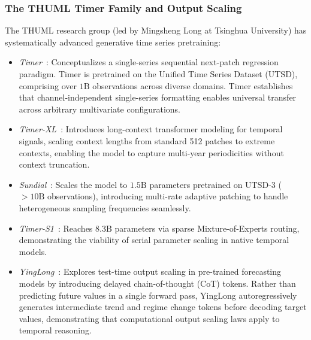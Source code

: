 \subsubsection{The THUML Timer Family and Output Scaling}
The THUML research group (led by Mingsheng Long at Tsinghua University) has systematically advanced generative time series pretraining:
\begin{itemize}[leftmargin=*]
    \item \emph{Timer}~\cite{liu2024timer}: Conceptualizes a single-series sequential next-patch regression paradigm. Timer is pretrained on the Unified Time Series Dataset (UTSD), comprising over $1\text{B}$ observations across diverse domains. Timer establishes that channel-independent single-series formatting enables universal transfer across arbitrary multivariate configurations.
    \item \emph{Timer-XL}~\cite{liu2024timerxl}: Introduces long-context transformer modeling for temporal signals, scaling context lengths from standard 512 patches to extreme contexts, enabling the model to capture multi-year periodicities without context truncation.
    \item \emph{Sundial}~\cite{thuml2025sundial}: Scales the model to $1.5\text{B}$ parameters pretrained on UTSD-3 ($>10\text{B}$ observations), introducing multi-rate adaptive patching to handle heterogeneous sampling frequencies seamlessly.
    \item \emph{Timer-S1}~\cite{thuml2026timers1}: Reaches $8.3\text{B}$ parameters via sparse Mixture-of-Experts routing, demonstrating the viability of serial parameter scaling in native temporal models.
    \item \emph{YingLong}~\cite{liu2025yinglong}: Explores test-time output scaling in pre-trained forecasting models by introducing delayed chain-of-thought (CoT) tokens. Rather than predicting future values in a single forward pass, YingLong autoregressively generates intermediate trend and regime change tokens before decoding target values, demonstrating that computational output scaling laws apply to temporal reasoning.
\end{itemize}


